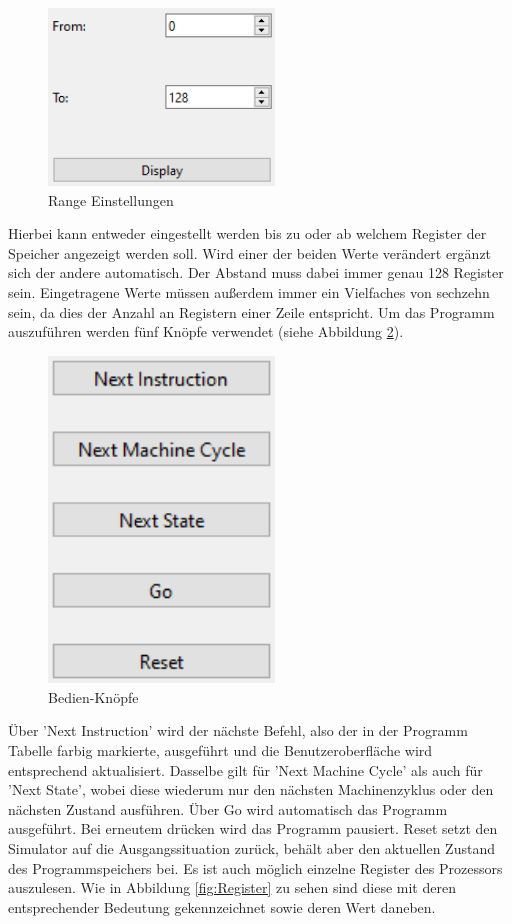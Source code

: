 \documentclass[12pt]{article}
\begin{document}
\begin{figure}[h]
\centering
\includegraphics[width=6cm]{bilder/Range}
\caption{Range Einstellungen}
\label{fig:Range}
\end{figure}

\noindent
Hierbei kann entweder eingestellt werden bis zu oder ab welchem Register der Speicher angezeigt werden soll. Wird einer der beiden Werte verändert ergänzt sich der andere automatisch. Der Abstand muss dabei immer genau 128 Register sein. Eingetragene Werte müssen außerdem immer ein Vielfaches von sechzehn sein, da dies der Anzahl an Registern einer Zeile entspricht. Um das Programm auszuführen werden fünf Knöpfe verwendet (siehe Abbildung \ref{fig:Bedienen}).\vspace{10pt}

\begin{figure}[h]
\centering
\includegraphics[width=6cm]{bilder/Bedienen}
\caption{Bedien-Knöpfe}
\label{fig:Bedienen}
\end{figure}

\noindent
Über 'Next Instruction' wird der nächste Befehl, also der in der Programm Tabelle farbig markierte, ausgeführt und die Benutzeroberfläche wird entsprechend aktualisiert. Dasselbe gilt für 'Next Machine Cycle' als auch für 'Next State', wobei diese wiederum nur den nächsten Machinenzyklus oder den nächsten Zustand ausführen. Über Go wird automatisch das Programm ausgeführt. Bei erneutem drücken wird das Programm pausiert. Reset setzt den Simulator auf die Ausgangssituation zurück, behält aber den aktuellen Zustand des Programmspeichers bei. Es ist auch möglich einzelne Register des Prozessors auszulesen. Wie in Abbildung \ref{fig:Register} zu sehen sind diese mit deren entsprechender Bedeutung gekennzeichnet sowie deren Wert daneben.\vspace{10pt}
\end{document}
